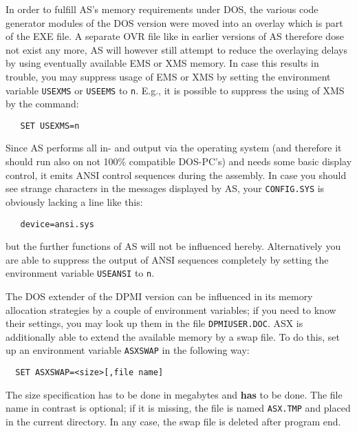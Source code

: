\documentclass[12pt,twoside]{report}
\newcommand{\bb}[1]{{\bf #1}}
\newcommand{\tty}[1]{{\tt #1}}
\begin{document}
In order to fulfill  AS's memory requirements under
DOS, the various code generator modules of the DOS version were moved into
an overlay which is part of the EXE file.  A separate OVR file like in
earlier versions of AS therefore dose not exist any more, AS will however
still attempt to reduce the overlaying delays by using eventually
available EMS or XMS memory.  In case this results in
trouble, you may suppress usage of EMS or XMS by setting the environment
variable \tty{USEXMS} or \tty{USEEMS} to \tty{n}.  E.g., it is possible to
suppress the using of XMS by the command:
\begin{verbatim}
   SET USEXMS=n
\end{verbatim}
Since AS performs all in- and output via the operating system (and
therefore it should run also on not 100\% compatible DOS-PC's) and
needs some basic display control, it emits ANSI control sequences
during the assembly.
In case you  should see strange characters in the
messages displayed by AS, your \tty{CONFIG.SYS} is obviously lacking a
line like this:
\begin{verbatim}
   device=ansi.sys
\end{verbatim}
but the further  functions of AS will not be
influenced hereby.  Alternatively you are able to suppress the output of
ANSI sequences completely by setting the environment variable
\tty{USEANSI} to \tty{n}.

The DOS extender of the DPMI version  can be
influenced in its memory allocation strategies by a couple of environment
variables; if you need to know their settings, you may look up them in the
file \tty{DPMIUSER.DOC}.  ASX is additionally able to extend the available
memory by a swap file.  To do this, set up an environment variable
\tty{ASXSWAP} in the following way:
\begin{verbatim}
  SET ASXSWAP=<size>[,file name]
\end{verbatim}
The size specification has to be done in megabytes and \bb{has} to be done.
The file name in contrast is optional; if it is missing, the file is
named \tty{ASX.TMP} and placed in the current directory.  In any case, the
swap file is deleted after program end.
\end{document}

